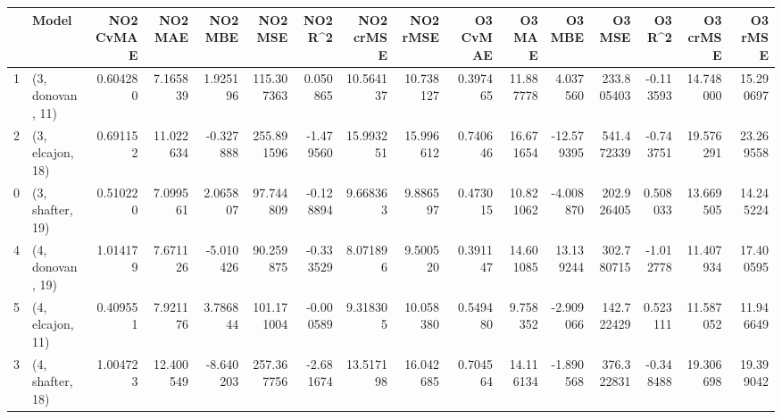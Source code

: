 \begin{tabular}{llrrrrrrrrrrrrrr}
\toprule
{} &             Model &  NO2 CvMAE &    NO2 MAE &   NO2 MBE &     NO2 MSE &   NO2 R\textasciicircum2 &  NO2 crMSE &   NO2 rMSE &  O3 CvMAE &     O3 MAE &     O3 MBE &      O3 MSE &    O3 R\textasciicircum2 &   O3 crMSE &    O3 rMSE \\
\midrule
1 &  (3, donovan, 11) &   0.604280 &   7.165839 &  1.925196 &  115.307363 &  0.050865 &  10.564137 &  10.738127 &  0.397465 &  11.887778 &   4.037560 &  233.805403 & -0.113593 &  14.748000 &  15.290697 \\
2 &  (3, elcajon, 18) &   0.691152 &  11.022634 & -0.327888 &  255.891596 & -1.479560 &  15.993251 &  15.996612 &  0.740646 &  16.671654 & -12.579395 &  541.472339 & -0.743751 &  19.576291 &  23.269558 \\
0 &  (3, shafter, 19) &   0.510220 &   7.099561 &  2.065807 &   97.744809 & -0.128894 &   9.668363 &   9.886597 &  0.473015 &  10.821062 &  -4.008870 &  202.926405 &  0.508033 &  13.669505 &  14.245224 \\
4 &  (4, donovan, 19) &   1.014179 &   7.671126 & -5.010426 &   90.259875 & -0.333529 &   8.071896 &   9.500520 &  0.391147 &  14.601085 &  13.139244 &  302.780715 & -1.012778 &  11.407934 &  17.400595 \\
5 &  (4, elcajon, 11) &   0.409551 &   7.921176 &  3.786844 &  101.171004 & -0.000589 &   9.318305 &  10.058380 &  0.549480 &   9.758352 &  -2.909066 &  142.722429 &  0.523111 &  11.587052 &  11.946649 \\
3 &  (4, shafter, 18) &   1.004723 &  12.400549 & -8.640203 &  257.367756 & -2.681674 &  13.517198 &  16.042685 &  0.704564 &  14.116134 &  -1.890568 &  376.322831 & -0.348488 &  19.306698 &  19.399042 \\
\bottomrule
\end{tabular}
